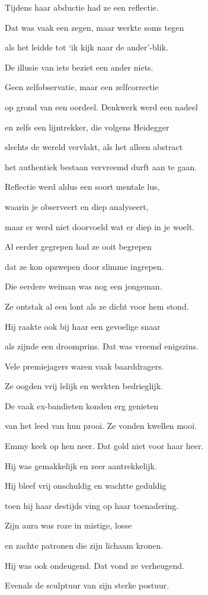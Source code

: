 Tijdens haar abductie
had ze een reflectie.

Dat was vaak een zegen,
maar werkte soms tegen

als het leidde tot ‘ik
kijk naar de ander'-blik.

De illusie van iets
beziet een ander niets.

Geen zelfobservatie,
maar een zelfcorrectie

op grond van een oordeel.
Denkwerk werd een nadeel

en zelfs een lijntrekker,
die volgens Heidegger

slechts de wereld vervlakt,
als het alleen abstract

het authentiek bestaan
vervreemd durft aan te gaan.

Reflectie werd aldus
een soort mentale lus,

waarin je observeert
en diep analyseert,

maar er werd niet doorvoeld
wat er diep in je woelt.

Al eerder gegrepen
had ze ooit begrepen

dat ze kon opzwepen
door slimme ingrepen.

Die eerdere weiman
was nog een jongeman.

Ze ontstak al een lont
als ze dicht voor hem stond.

Hij raakte ook bij haar
een gevoelige snaar

als zijnde een droomprins.
Dat was vreemd enigszins.

Vele premiejagers
waren vaak baarddragers.

Ze oogden vrij lelijk
en werkten bedrieglijk.

De vaak ex-bandieten
konden erg genieten

van het leed van hun prooi.
Ze vonden kwellen mooi.

Emmy keek op hen neer.
Dat gold niet voor haar heer.

Hij was gemakkelijk
en zeer aantrekkelijk.

Hij bleef vrij onschuldig
en wachtte geduldig

toen hij haar destijds ving
op haar toenadering.

Zijn aura was roze
in mistige, losse

en zachte patronen
die zijn lichaam kronen.

Hij was ook ondeugend.
Dat vond ze verheugend.

Evenals de sculptuur
van zijn sterke postuur.

